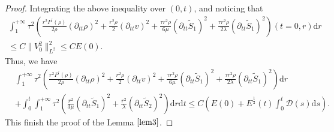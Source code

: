 \documentclass[10pt,reqno]{amsart}
\numberwithin{equation}{section}
\begin{document}
\begin{proof}
		Integrating the above inequality over $(0, t)$, and noticing that
		\begin{align*}\nonumber
			\int_{1}^{+\infty}\tau^2
			\left(\frac{r^2 P^{\prime}(\rho)}{2\rho} (\partial_{tt}\rho)^2
			+\frac{r^2\rho}{2}(\partial_{tt}v)^2
			+\frac{\tau r^2 \rho}{6\mu} (\partial_{tt}\tilde{S}_1)^2  
			+\frac{\tau r^2 \rho}{2\lambda}  (\partial_{tt}\tilde{S}_1)^2 \right)(t=0,r)\mathrm{d}r\\
			\leq C \|V_0^2\|_{L^2}^2\leq C E(0).
		\end{align*}
		Thus, we have
		\begin{equation}\label{order-2-tt}
			\begin{aligned}
				&\int_{1}^{+\infty} \tau^2
				\left(\frac{r^2 P^{\prime}(\rho)}{2\rho} (\partial_{tt}\rho)^2
				+\frac{r^2\rho}{2}(\partial_{tt}v)^2
				+\frac{\tau r^2 \rho}{6\mu} (\partial_{tt}\tilde{S}_1)^2 +\frac{\tau r^2 \rho}{2\lambda}  (\partial_{tt}\tilde{S}_1)^2 \right)\mathrm{d}r\\
				&+\int_{0}^{t}\int_{1}^{+\infty} \tau^2\left(\frac{r^2}{3 \mu}(\partial_{tt}\tilde{S}_1)^2
				+\frac{r^2}{\lambda}(\partial_{tt}\tilde{S}_2)^2\right)
				\mathrm{d}r\mathrm{d}t
				\leq C\left(E(0)+ E^{\frac{1}{2}}(t) \int_{0}^t \mathcal{D}(s)\mathrm{d}s\right).
			\end{aligned}
		\end{equation}
		This finish the proof of the Lemma $\ref{lem3}$.
	\end{proof}
	
\end{document}
